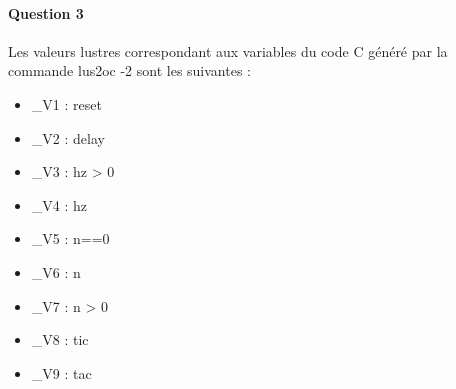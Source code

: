\documentclass[a4paper, 11pt]{article}
\begin{document}
\paragraph{Question 3}
Les valeurs lustres correspondant aux variables du code C généré par la commande lus2oc -2 sont les suivantes :
\begin{itemize}
  \item \_V1 : reset
  \item \_V2 : delay
  \item \_V3 : hz > 0
  \item \_V4 : hz
  \item \_V5 : n==0
  \item \_V6 : n
  \item \_V7 : n > 0
  \item \_V8 : tic
  \item \_V9 : tac
\end{itemize}
\end{document}
